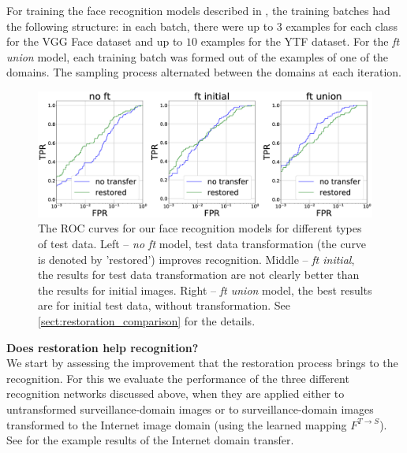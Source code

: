 For training the face recognition models described in , the training batches had the following structure: in each batch, there were up to $3$ examples for each class for the VGG Face dataset and up to $10$ examples for the YTF dataset. For the \textit{ft union} model, each training batch was formed out of the examples of one of the domains. The sampling process alternated between the domains at each iteration.


  
 \begin{figure}
  \centering
    \includegraphics[width=\linewidth]{Chapters/face/Fig3.eps}
    \caption{The ROC curves for our face recognition models for different types of test data. Left -- \textit{no ft} model, test data transformation (the curve is denoted by 'restored') improves recognition. Middle -- \textit{ft initial}, the results for test data transformation are not clearly better than the results for initial images. Right -- \textit{ft union} model, the best results are for initial test data, without transformation. See \ref{sect:restoration_comparison} for the details. }\label{fig:roc_oxford_gan_vs_initial}
  \end{figure}

\bigskip\indent\textbf{Does restoration help recognition?} \\
\label{sect:restoration_comparison}
We start by assessing the improvement that the restoration process brings to the recognition. For this we evaluate the performance of the three different recognition networks discussed above, when they are applied either to untransformed surveillance-domain images or to surveillance-domain images transformed to the Internet image domain (using the learned mapping $F^{T \rightarrow S}$). See   for the example results of the Internet domain  transfer.

